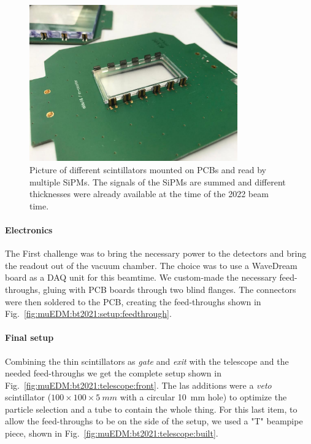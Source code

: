 \begin{refsection}
        \begin{figure}
            \centering
            \includegraphics[width = 0.8\textwidth]{Figures/muEDM/thin_scintillators.jpg}
            \caption[muEDM 2022: Thin scintillators for the beamtimes]{Picture of different scintillators mounted on PCBs and read by multiple SiPMs. The signals of the SiPMs are summed and different thicknesses were already available at the time of the 2022 beam time.}
            \label{fig:muEDM:thin_scintillators}
        \end{figure}

        \paragraph{Electronics}
        The First challenge was to bring the necessary power to the detectors and bring the readout out of the vacuum chamber.
        The choice was to use a WaveDream board as a DAQ unit for this beamtime.
        We custom-made the necessary feed-throughs, gluing with \stycast PCB boards through two blind flanges.
        The connectors were then soldered to the PCB, creating the feed-throughs shown in Fig.~\ref{fig:muEDM:bt2021:setup:feedthrough}.
        
        \paragraph{Final setup}
        Combining the thin scintillators as \textit{gate} and \textit{exit} with the telescope and the needed feed-throughs we get the complete setup shown in Fig.~\ref{fig:muEDM:bt2021:telescope:front}.
        The las additions were a \textit{veto} scintillator ($100\times 100\times\SI{5}{mm}$ with a circular \SI{10}{mm} hole) to optimize the particle selection and a tube to contain the whole thing.
        For this last item, to allow the feed-throughs to be on the side of the setup, we used a "T" beampipe piece, shown in Fig.~\ref{fig:muEDM:bt2021:telescope:built}.
        

\end{refsection}
